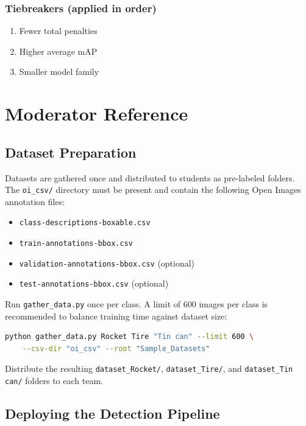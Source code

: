 \documentclass[11pt,a4paper]{article}
\begin{document}
\subsubsection*{Tiebreakers (applied in order)}

\begin{enumerate}
    \item Fewer total penalties
    \item Higher average mAP
    \item Smaller model family
\end{enumerate}

\section{Moderator Reference}

\subsection{Dataset Preparation}

Datasets are gathered once and distributed to students as pre-labeled folders. The \texttt{oi\_csv/} directory must be present and contain the following Open Images annotation files:

\begin{itemize}
    \item \texttt{class-descriptions-boxable.csv}
    \item \texttt{train-annotations-bbox.csv}
    \item \texttt{validation-annotations-bbox.csv} (optional)
    \item \texttt{test-annotations-bbox.csv} (optional)
\end{itemize}

Run \texttt{gather\_data.py} once per class. A limit of 600 images per class is recommended to balance training time against dataset size:

\begin{lstlisting}[language=bash]
python gather_data.py Rocket Tire "Tin can" --limit 600 \
    --csv-dir "oi_csv" --root "Sample_Datasets"
\end{lstlisting}

Distribute the resulting \texttt{dataset\_Rocket/}, \texttt{dataset\_Tire/}, and \texttt{dataset\_Tin can/} folders to each team.

\subsection{Deploying the Detection Pipeline}
\end{document}
